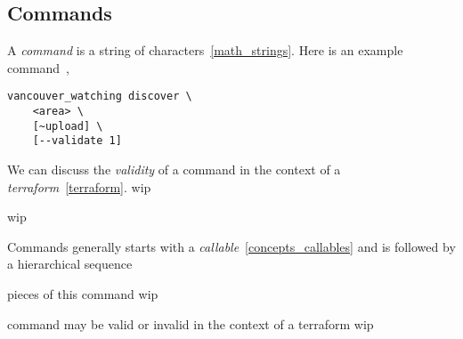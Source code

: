 \subsection{Commands}
\label{commands}

A \emph{command} is a string of characters~\ref{math_strings}. Here is an example command~\cite{vanwatch},

\begin{verbatim}
vancouver_watching discover \
    <area> \
    [~upload] \
    [--validate 1]
\end{verbatim}

We can discuss the \emph{validity} of a command in the context of a \emph{terraform}~\ref{terraform}. wip

wip

Commands generally starts with a \emph{callable}~\ref{concepts_callables} and is followed by a hierarchical sequence 

pieces of this command wip

command may be valid or invalid in the context of a terraform wip


